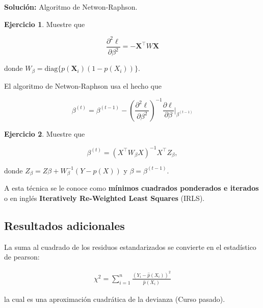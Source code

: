 \documentclass[
  12pt,
]{book}
\theoremstyle{definition}
\theoremstyle{definition}
\theoremstyle{definition}
\newtheorem{exercise}{Ejercicio}[chapter]
\theoremstyle{definition}
\theoremstyle{remark}
\begin{document}
\textbf{Solución:} Algoritmo de Netwon-Raphson.

\begin{exercise}
\protect\hypertarget{exr:unnamed-chunk-186}{}\label{exr:unnamed-chunk-186}Muestre que

\begin{equation*}
\frac{\partial^{2} \ell}{\partial \beta^{2}} = -\boldsymbol{X}^{\top}W\boldsymbol{X} 
\end{equation*}

donde \(W_\beta = \mathrm{diag}\{p(\boldsymbol{X}_{i})(1-p(X_{i}))\}\).
\end{exercise}

El algoritmo de Netwon-Raphson usa el hecho que

\begin{equation*}
\beta^{(t)} = \beta ^{(t-1)} - \left(  \frac{\partial^{2} \ell}{\partial \beta^{2}}\right)^{-1} \frac{\partial \ell}{\partial \beta}  \Bigg\vert_{\beta ^{(t-1)}}
\end{equation*}

\begin{exercise}
\protect\hypertarget{exr:unnamed-chunk-187}{}\label{exr:unnamed-chunk-187}Muestre que

\begin{equation*}
\beta^{(t)} = \left( X^{\top}W_\beta X \right)^{-1}X^{\top}Z_{\beta},
\end{equation*}

donde \(Z_{\beta} = Z\beta + W^{-1}_{\beta} (Y-p(X))\) y \(\beta=\beta^{(t-1)}\).
\end{exercise}

A esta técnica se le conoce como \textbf{mínimos cuadrados ponderados e iterados} o en inglés \textbf{Iteratively Re-Weighted Least Squares} (IRLS).

\hypertarget{resultados-adicionales}{%
\subsection{Resultados adicionales}\label{resultados-adicionales}}

La suma al cuadrado de los residuos estandarizados se convierte en el estadístico de pearson:

\begin{align*}
\chi^{2}=\sum_{i=1}^{n} \frac{\left(Y_{i}-\hat{p}(X_{i})\right)^{2}}{\hat{p}(X_{i})}
\end{align*}

la cual es una aproximación cuadrática de la devianza (Curso pasado).
\end{document}
